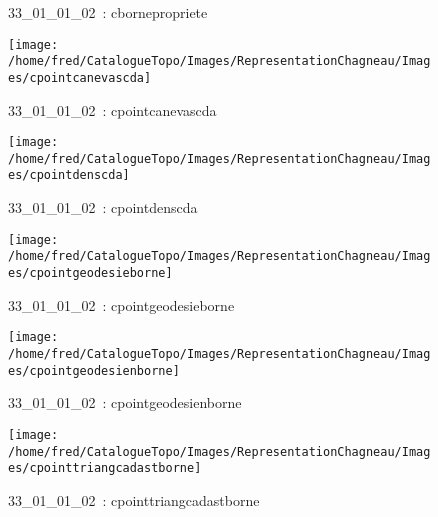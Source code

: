 \documentclass[12pt,titlepage]{book}
\begin{document}
\begin{figure}[h!]
\begin{minipage}[t]{3cm}
\begin{center}
      \caption[~33\_01\_01\_02]{\small{33\_01\_01\_02~:} \tiny{cbornepropriete}}\label{cbornepropriete}
    \end{center}
  \end{minipage}
  \begin{minipage}[t]{3cm}
    \begin{center}
      \texttt{[image: /home/fred/CatalogueTopo/Images/RepresentationChagneau/Images/cpointcanevascda]}
      \caption[~33\_01\_01\_02]{\small{33\_01\_01\_02~:} \tiny{cpointcanevascda}}\label{cpointcanevascda}
    \end{center}
  \end{minipage}
  \begin{minipage}[t]{3cm}
    \begin{center}
      \texttt{[image: /home/fred/CatalogueTopo/Images/RepresentationChagneau/Images/cpointdenscda]}
      \caption[~33\_01\_01\_02]{\small{33\_01\_01\_02~:} \tiny{cpointdenscda}}\label{cpointdenscda}
    \end{center}
  \end{minipage}
  \begin{minipage}[t]{3cm}
    \begin{center}
      \texttt{[image: /home/fred/CatalogueTopo/Images/RepresentationChagneau/Images/cpointgeodesieborne]}
      \caption[~33\_01\_01\_02]{\small{33\_01\_01\_02~:} \tiny{cpointgeodesieborne}}\label{cpointgeodesieborne}
    \end{center}
  \end{minipage}
  \begin{minipage}[t]{3cm}
    \begin{center}
      \texttt{[image: /home/fred/CatalogueTopo/Images/RepresentationChagneau/Images/cpointgeodesienborne]}
      \caption[~33\_01\_01\_02]{\small{33\_01\_01\_02~:} \tiny{cpointgeodesienborne}}\label{cpointgeodesienborne}
    \end{center}
  \end{minipage}
  \begin{minipage}[t]{3cm}
    \begin{center}
      \texttt{[image: /home/fred/CatalogueTopo/Images/RepresentationChagneau/Images/cpointtriangcadastborne]}
      \caption[~33\_01\_01\_02]{\small{33\_01\_01\_02~:} \tiny{cpointtriangcadastborne}}\label{cpointtriangcadastborne}

\end{center}
\end{minipage}
\end{figure}
\end{document}
